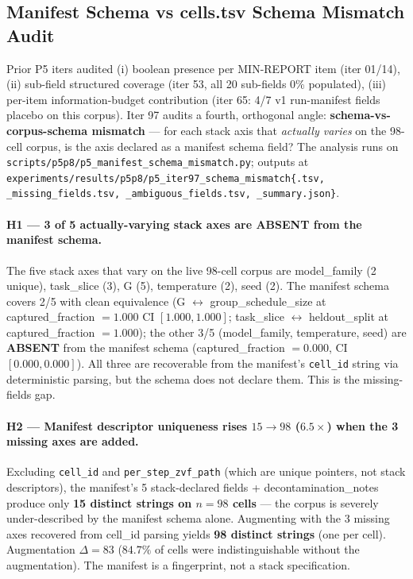 \subsection{Manifest Schema vs cells.tsv Schema Mismatch Audit}
\label{sec:p5-iter97-schema-mismatch}

Prior P5 iters audited (i) boolean presence per MIN-REPORT item
(iter 01/14), (ii) sub-field structured coverage (iter 53, all 20
sub-fields 0\% populated), (iii) per-item information-budget
contribution (iter 65: 4/7 v1 run-manifest fields placebo on this corpus). Iter 97
audits a fourth, orthogonal angle: \textbf{schema-vs-corpus-schema
mismatch} --- for each stack axis that \emph{actually varies} on the
98-cell corpus, is the axis declared as a manifest schema field? The
analysis runs on
\texttt{scripts/p5p8/p5\_manifest\_schema\_mismatch.py}; outputs at
\texttt{experiments/results/p5p8/p5\_iter97\_schema\_mismatch\{.tsv,
\_missing\_fields.tsv, \_ambiguous\_fields.tsv, \_summary.json\}}.

\paragraph{H1 --- 3 of 5 actually-varying stack axes are ABSENT from
the manifest schema.}
The five stack axes that vary on the live 98-cell corpus are
\textsf{model\_family} (2 unique), \textsf{task\_slice} (3),
\textsf{G} (5), \textsf{temperature} (2), \textsf{seed} (2). The
manifest schema covers 2/5 with clean equivalence (\textsf{G}
$\leftrightarrow$ \textsf{group\_schedule\_size} at captured\_fraction
$=1.000$ CI $[1.000, 1.000]$; \textsf{task\_slice} $\leftrightarrow$
\textsf{heldout\_split} at captured\_fraction $=1.000$); the other
3/5 (\textsf{model\_family}, \textsf{temperature}, \textsf{seed})
are \textbf{ABSENT} from the manifest schema
(captured\_fraction $=0.000$, CI $[0.000, 0.000]$). All three are
recoverable from the manifest's \texttt{cell\_id} string via
deterministic parsing, but the schema does not declare them. This
is the missing-fields gap.

\paragraph{H2 --- Manifest descriptor uniqueness rises $15 \to 98$
($6.5\times$) when the 3 missing axes are added.}
Excluding \texttt{cell\_id} and \texttt{per\_step\_zvf\_path} (which
are unique pointers, not stack descriptors), the manifest's 5
stack-declared fields + \textsf{decontamination\_notes} produce
only \textbf{15 distinct strings on $n{=}98$ cells} --- the corpus
is severely under-described by the manifest schema alone. Augmenting
with the 3 missing axes recovered from cell\_id parsing yields
\textbf{98 distinct strings} (one per cell). Augmentation
$\Delta = 83$ ($84.7\%$ of cells were indistinguishable without
the augmentation). The manifest is a fingerprint, not a stack
specification.

